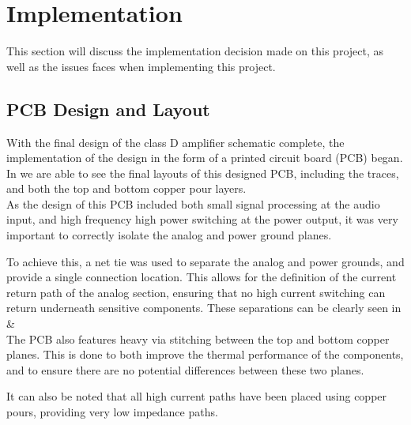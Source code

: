 \documentclass[a4paper,11pt]{article}
\begin{document}
\section{Implementation}  

This section will discuss the implementation decision made on this project, as well as the issues faces when implementing this project. 

\subsection{PCB Design and Layout}

With the final design of the class D amplifier schematic complete, the implementation of the design in the form of a printed circuit board (PCB) began. In  we are able to see the final layouts of this designed PCB, including the traces, and both the top and bottom copper pour layers.\\

As the design of this PCB included both small signal processing at the audio input, and high frequency high power switching at the power output, it was very important to correctly isolate the analog and power ground planes. 

To achieve this, a net tie was used to separate the analog and power grounds, and provide a single connection location. This allows for the definition of the current return path of the analog section, ensuring that no high current switching can return underneath sensitive components. These separations can be clearly seen in  \& \\

The PCB also features heavy via stitching between the top and bottom copper planes. This is done to both improve the thermal performance of the components, and to ensure there are no potential differences between these two planes. 

It can also be noted that all high current paths have been placed using copper pours, providing very low impedance paths.
\end{document}
